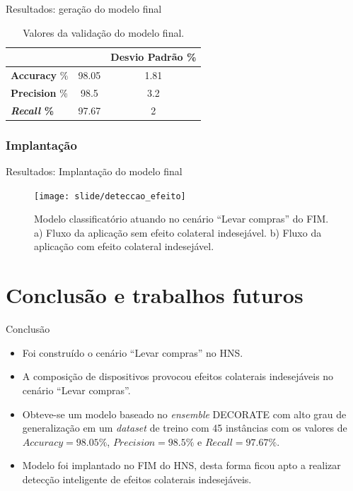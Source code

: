 \documentclass[brazil]{beamer}
\begin{document}
\begin{frame}{Resultados: geração do modelo final}
\begin{table}[!htp]
  \centering
  \begin{tabular}{ |l|c|c|}
    \hline
       {\bf } & {\bf } & {\bf Desvio Padrão \%} \\
    \hline
       \textbf{Accuracy} \% & 98.05 & 1.81 \\
    \hline
       \textbf{Precision} \% & 98.5 & 3.2 \\
    \hline
       \textbf{\textit{Recall} \%} & 97.67 & 2 \\
    \hline
  \end{tabular}
  \caption{Valores da validação do modelo final.}
  \label{table:valmodelfinal}
\end{table}
\end{frame}


\subsubsection{Implantação}
\begin{frame}{Resultados: Implantação do modelo final}
   \begin{figure}[!htb] \centering 
     \centering
     \texttt{[image: slide/deteccao\_efeito]} 
     \caption{ \justifying Modelo classificatório atuando no cenário ``Levar compras'' do FIM. a) Fluxo da aplicação sem efeito colateral indesejável. b) Fluxo da aplicação com efeito colateral indesejável.} 
     \label{fig:deteccao_efeito}
   \end{figure}
\end{frame}


\section{Conclusão e trabalhos futuros}
\begin{frame}{Conclusão}
   \begin{itemize}
\justifying
      \item <1 ->Foi construído o cenário ``Levar compras'' no HNS.
      \item <2 ->A composição de dispositivos provocou efeitos colaterais indesejáveis no cenário ``Levar compras''.
      \item <3 ->Obteve-se um modelo baseado no \textit{ensemble} DECORATE com alto grau de generalização em um \textit{dataset} de treino com 45 instâncias com os valores de $\textit{Accuracy}=98.05\%$, $\textit{Precision}=98.5\%$ e $\textit{Recall}=97.67\%$. 
      \item <4 ->Modelo foi implantado no FIM do HNS, desta forma ficou apto a realizar detecção inteligente de efeitos colaterais indesejáveis.
   \end{itemize}
\end{frame}
\end{document}
